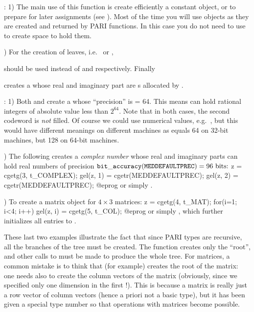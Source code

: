 : 1)  The main use of this function is create efficiently
a constant object, or to prepare for later assignments (see
). Most of the time you will use  objects as they
are created and returned by PARI functions. In this case you do not need to
use  to create space to hold them.

) For the creation of leaves, i.e.~ or ,



\noindent should be used instead of  and
 respectively. Finally


\noindent creates a  whose real and imaginary part are
s allocated by .

: 1) Both  and
 create a  whose ``precision'' is
 = 64. This means  can hold rational
integers of absolute value less than $2^{64}$. Note that in both cases, the
second codeword is \emph{not} filled. Of course we could use numerical
values, e.g.~, but this would have different meanings on
different machines as  equals 64 on 32-bit machines,
but 128 on 64-bit machines.

) The following creates a \emph{complex number} whose real and
imaginary parts can hold real numbers of precision
${\tt bit\_accuracy(MEDDEFAULTPREC)} = 96\hbox{ bits:}$
%
\bprog
  z = cgetg(3, t_COMPLEX);
  gel(z, 1) = cgetr(MEDDEFAULTPREC);
  gel(z, 2) = cgetr(MEDDEFAULTPREC);
@eprog\noindent
or simply .

) To create a matrix object for $4\times 3$ matrices:
%
\bprog
  z = cgetg(4, t_MAT);
  for(i=1; i<4; i++) gel(z, i) = cgetg(5, t_COL);
@eprog\noindent
or simply , which further initializes all entries
to .

These last two examples illustrate the fact that since PARI types are
recursive, all the branches of the tree must be created. The function
 creates only the ``root'', and other calls to  must be
made to produce the whole tree. For matrices, a common mistake is to think
that  (for example) creates the root of the
matrix: one needs also to create the column vectors of the matrix (obviously,
since we specified only one dimension in the first !). This is
because a matrix is really just a row vector of column vectors (hence a
priori not a basic type), but it has been given a special type number so that
operations with matrices become possible.


